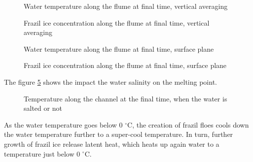 \begin{figure}[H]
    \begin{center}
    \end{center}
    \caption{Water temperature along the flume at final time, vertical averaging}
    \label{fig:2d_temperature}
\end{figure}

\begin{figure}[H]
    \begin{center}
    \end{center}
    \caption{Frazil ice concentration along the flume at final time, vertical averaging}
    \label{fig:2d_frazil}
\end{figure}

\begin{figure}[H]
    \begin{center}
    \end{center}
    \caption{Water temperature along the flume at final time, surface plane}
    \label{fig:surf_temperature}
\end{figure}


\begin{figure}[H]
    \begin{center}
    \end{center}
    \caption{Frazil ice concentration along the flume at final time, surface plane}
    \label{fig:surf_frazil}
\end{figure}

The figure \ref{fig:salinity} shows the impact the water salinity on the melting point.

\begin{figure}[H]
    \begin{center}
    \end{center}
    \caption{Temperature along the channel at the final time, when the water is salted or not}
    \label{fig:salinity}
\end{figure}

As the water temperature goes below 0 $^\circ$C, the creation of frazil floes cools down the water temperature further to a super-cool temperature. In turn, further growth of frazil ice release latent heat, which heats up again water to a temperature just below 0 $^\circ$C.

